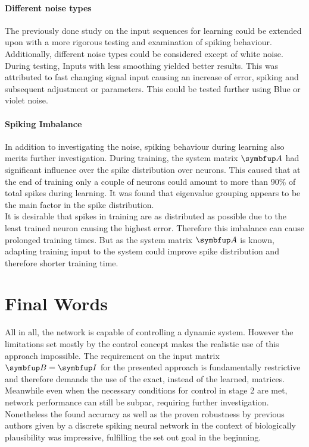 \paragraph{Different noise types}
The previously done study on the input sequences for learning could be extended upon with a more rigorous testing and examination of spiking behaviour. Additionally, different noise types could be considered except of white noise. During testing, Inputs with less smoothing yielded better results. This was attributed to fast changing signal input causing an increase of error, spiking and subsequent adjustment or parameters. This could be tested further using Blue or violet noise.
\paragraph{Spiking Imbalance}
In addition to investigating the noise, spiking behaviour during learning also merits further investigation. During training, the system matrix $\bmu{A}$ had significant influence over the spike distribution over neurons. This caused that at the end of training only a couple of neurons could amount to more than 90\% of total spikes during learning. It was found that eigenvalue grouping appears to be the main factor in the spike distribution.\\
It is desirable that spikes in training are as distributed as possible due to the least trained neuron causing the highest error. Therefore this imbalance can cause prolonged training times. But as the system matrix $\bmu{A}$ is known, adapting training input to the system could improve spike distribution and therefore shorter training time.\\

\section{Final Words}

All in all, the network is capable of controlling a dynamic system. However the limitations set mostly by the control concept makes the realistic use of this approach impossible. The requirement on the input matrix $\bmu{B} = \bmu{I}$ for the presented approach is fundamentally restrictive and therefore demands the use of the exact, instead of the learned, matrices. Meanwhile even when the necessary conditions for control in stage 2 are met, network performance can still be subpar, requiring further investigation.\\

Nonetheless the found accuracy as well as the proven robustness by previous authors given by a discrete spiking neural network in the context of biologically plausibility was impressive, fulfilling the set out goal in the beginning.\\




